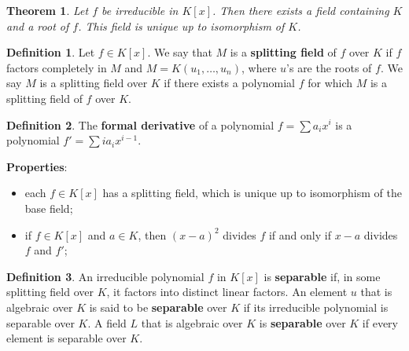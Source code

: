 \documentclass[11pt]{amsart}
\newtheorem*{theorem*}{Theorem}
\theoremstyle{definition}
\newtheorem*{definition*}{Definition}
\renewcommand\:{\colon}
\newcommand{\1}{\mathds{1}}
\begin{document}
\begin{theorem*}
	Let $f$ be irreducible in $K[x]$. Then there exists a field containing $K$ and a root of $f$. This field is unique up to isomorphism of $K$.
\end{theorem*}

\begin{definition*}
	Let $f \in K[x]$. We say that $M$ is a \textbf{splitting field} of $f$ over $K$ if $f$ factors completely in $M$ and $M = K(u_1, \dots, u_n)$, where $u$'s are the roots of $f$. We say $M$ is a splitting field over $K$ if there exists a polynomial $f$ for which $M$ is a splitting field of $f$ over $K$.
\end{definition*}

\begin{definition*}
	The \textbf{formal derivative} of a polynomial $f = \sum a_ix^i$ is a polynomial $f' = \sum ia_ix^{i-1}$. 
\end{definition*}

\noindent \textbf{Properties}:
\begin{itemize}[leftmargin=*]\setlength\itemsep{0em}
	\item each $f \in K[x]$ has a splitting field, which is unique up to isomorphism of the base field;
	\item if $f \in K[x]$ and $a \in K$, then $(x-a)^2$ divides $f$ if and only if $x-a$ divides $f$ and $f'$;
\end{itemize}

\begin{definition*}
	An irreducible polynomial $f$ in $K[x]$ is \textbf{separable} if, in some splitting field over $K$, it factors into distinct linear factors. An element $u$ that is algebraic over $K$ is said to be \textbf{separable} over $K$ if its irreducible polynomial is separable over $K$. A field $L$ that is algebraic over $K$ is \textbf{separable} over $K$ if every element is separable over $K$.
\end{definition*}
\end{document}
